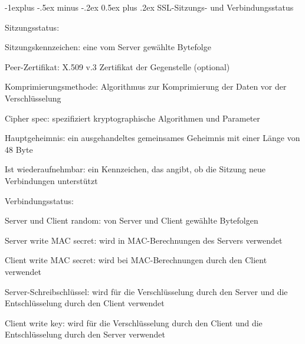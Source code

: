 \documentclass[a4paper]{article}
\makeatletter
\renewcommand{\subsection}{\@startsection{subsection}{2}{0mm}%
 {-1explus -.5ex minus -.2ex}%
 {0.5ex plus .2ex}%
 {\normalfont\normalsize\bfseries}}
\makeatother
\begin{document}
\begin{multicols}{3}
\begin{itemize*}
            \subsection{SSL-Sitzungs- und
                  Verbindungsstatus}
            \begin{itemize*}
                  \item Sitzungsstatus:
                  \begin{itemize*}
                        \item Sitzungskennzeichen: eine vom Server gewählte Bytefolge
                        \item Peer-Zertifikat: X.509 v.3 Zertifikat der Gegenstelle (optional)
                        \item Komprimierungsmethode: Algorithmus zur Komprimierung der Daten vor der Verschlüsselung
                        \item Cipher spec: spezifiziert kryptographische Algorithmen und Parameter
                        \item Hauptgeheimnis: ein ausgehandeltes gemeinsames Geheimnis mit einer Länge von 48 Byte
                        \item Ist wiederaufnehmbar: ein Kennzeichen, das angibt, ob die Sitzung neue Verbindungen unterstützt
                  \end{itemize*}
                  \item Verbindungsstatus:
                  \begin{itemize*}
                        \item Server und Client random: von Server und Client gewählte Bytefolgen
                        \item Server write MAC secret: wird in MAC-Berechnungen des Servers verwendet
                        \item Client write MAC secret: wird bei MAC-Berechnungen durch den Client verwendet
                        \item Server-Schreibschlüssel: wird für die Verschlüsselung durch den Server und die Entschlüsselung durch den Client verwendet
                        \item Client write key: wird für die Verschlüsselung durch den Client und die Entschlüsselung durch den Server verwendet
                  \end{itemize*}
            \end{itemize*}


\end{itemize*}
\end{multicols}
\end{document}

